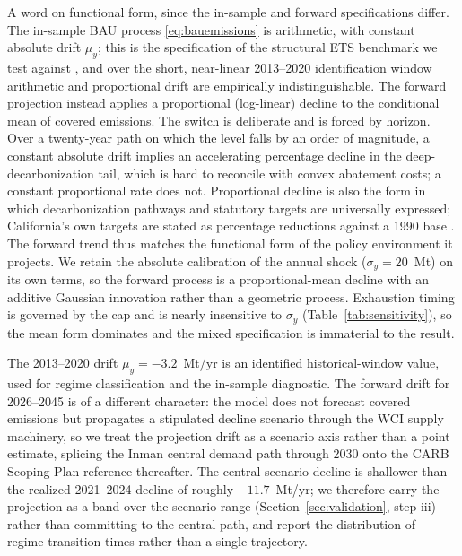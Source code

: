 \documentclass[11pt,letterpaper]{article}
\theoremstyle{plain}
\theoremstyle{definition}
\numberwithin{equation}{section}
\begin{document}
A word on functional form, since the in-sample and forward specifications differ. The in-sample BAU process \eqref{eq:bauemissions} is arithmetic, with constant absolute drift $\mu_y$; this is the specification of the structural ETS benchmark we test against \citep{carmona2011, hitzemann2018}, and over the short, near-linear 2013--2020 identification window arithmetic and proportional drift are empirically indistinguishable. The forward projection instead applies a proportional (log-linear) decline to the conditional mean of covered emissions. The switch is deliberate and is forced by horizon. Over a twenty-year path on which the level falls by an order of magnitude, a constant absolute drift implies an accelerating percentage decline in the deep-decarbonization tail, which is hard to reconcile with convex abatement costs; a constant proportional rate does not. Proportional decline is also the form in which decarbonization pathways and statutory targets are universally expressed; California's own targets are stated as percentage reductions against a 1990 base \citep{sb32, ab1279}. The forward trend thus matches the functional form of the policy environment it projects. We retain the absolute calibration of the annual shock ($\sigma_y=20$~Mt) on its own terms, so the forward process is a proportional-mean decline with an additive Gaussian innovation rather than a geometric process. Exhaustion timing is governed by the cap and is nearly insensitive to $\sigma_y$ (Table~\ref{tab:sensitivity}), so the mean form dominates and the mixed specification is immaterial to the result.

The 2013--2020 drift $\mu_y=-3.2$~Mt/yr is an identified historical-window value, used for regime classification and the in-sample diagnostic. The forward drift for 2026--2045 is of a different character: the \citet{inman2020} model does not forecast covered emissions but propagates a stipulated decline scenario through the WCI supply machinery, so we treat the projection drift as a scenario axis rather than a point
estimate, splicing the Inman central demand path through 2030 onto the CARB Scoping Plan reference thereafter. The central scenario decline is shallower than the realized 2021--2024 decline of roughly $-11.7$~Mt/yr; we therefore carry the projection as a band over the scenario range (Section~\ref{sec:validation}, step iii) rather than committing to the central path, and report the distribution of regime-transition times rather than a single trajectory.
 
\end{document}
